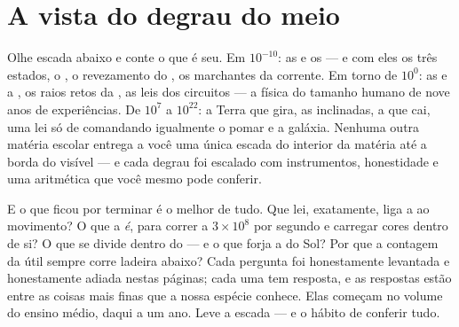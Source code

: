 \section{A vista do degrau do meio}

\begin{remark}\label{rem:g9:atoms-to-galaxies:built}
Olhe escada abaixo e conte o que é seu. Em $10^{-10}$: as  e
os  --- e com eles os três estados, o , o revezamento do
, os marchantes da corrente. Em torno de $10^{0}$: as  e a
, os raios retos da , as leis dos circuitos --- a física do
tamanho humano de nove anos de experiências. De $10^{7}$ a $10^{22}$:
a Terra que gira, as  inclinadas, a  que cai, uma lei só
de  comandando igualmente o pomar e a galáxia. Nenhuma
outra matéria escolar entrega a você uma única escada do interior da
matéria até a borda do visível --- e cada degrau foi escalado com
instrumentos, honestidade e uma aritmética que você mesmo pode
conferir.
\end{remark}

\begin{remark}\label{rem:g9:atoms-to-galaxies:ahead}
E o que ficou por terminar é o melhor de tudo. Que lei, exatamente,
liga a  ao movimento? O que a  \emph{é}, para correr a
$3 \times 10^{8}$  por segundo e carregar cores dentro de si? O
que se divide dentro do  --- e o que forja a  do Sol? Por
que a contagem da  útil sempre corre ladeira abaixo? Cada
pergunta foi honestamente levantada e honestamente adiada nestas
páginas; cada uma tem resposta, e as respostas estão entre as coisas
mais finas que a nossa espécie conhece. Elas começam no volume do
ensino médio, daqui a um ano. Leve a escada --- e o hábito de
conferir tudo.
\end{remark}

